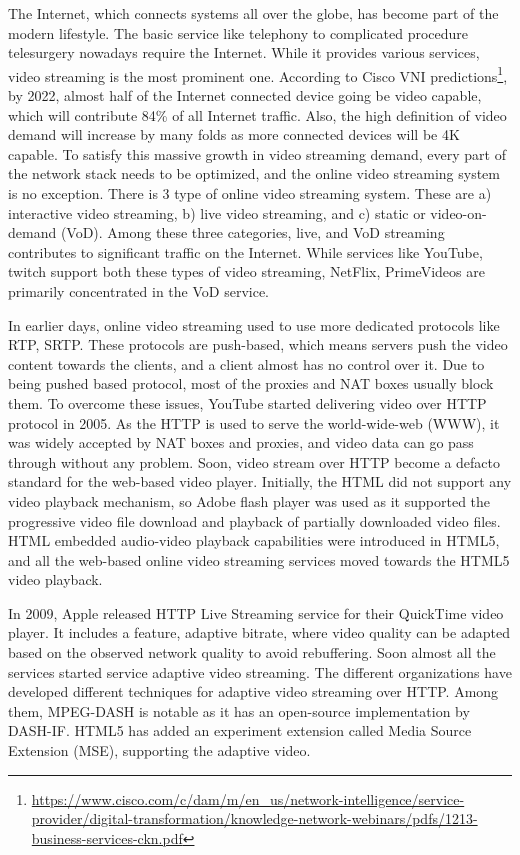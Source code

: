 The Internet, which connects systems all over the globe, has become part of the modern lifestyle. The basic service like telephony to complicated procedure telesurgery nowadays require the Internet. While it provides various services, video streaming is the most prominent one. According to Cisco VNI predictions\footnote{\url{https://www.cisco.com/c/dam/m/en_us/network-intelligence/service-provider/digital-transformation/knowledge-network-webinars/pdfs/1213-business-services-ckn.pdf}}, by 2022, almost half of the Internet connected device going be video capable, which will contribute 84\% of all Internet traffic. Also, the high definition of video demand will increase by many folds as more connected devices will be 4K capable. To satisfy this massive growth in video streaming demand, every part of the network stack needs to be optimized, and the online video streaming system is no exception. There is 3 type of online video streaming system. These are a) interactive video streaming, b) live video streaming, and c) static or video-on-demand (VoD). Among these three categories, live, and VoD streaming contributes to significant traffic on the Internet. While services like YouTube, twitch support both these types of video streaming, NetFlix, PrimeVideos are primarily concentrated in the VoD service. 

In earlier days, online video streaming used to use more dedicated protocols like RTP, SRTP. These protocols are push-based, which means servers push the video content towards the clients, and a client almost has no control over it. Due to being pushed based protocol, most of the proxies and NAT boxes usually block them. To overcome these issues, YouTube started delivering video over HTTP protocol in 2005. As the HTTP is used to serve the world-wide-web (WWW), it was widely accepted by NAT boxes and proxies, and video data can go pass through without any problem. Soon, video stream over HTTP become a defacto standard for the web-based video player. Initially, the HTML did not support any video playback mechanism, so Adobe flash player was used as it supported the progressive video file download and playback of partially downloaded video files. HTML embedded audio-video playback capabilities were introduced in HTML5, and all the web-based online video streaming services moved towards the HTML5 video playback.

In 2009, Apple released HTTP Live Streaming service for their QuickTime video player. It includes a feature, adaptive bitrate, where video quality can be adapted based on the observed network quality to avoid rebuffering. Soon almost all the services started service adaptive video streaming. The different organizations have developed different techniques for adaptive video streaming over HTTP. Among them, MPEG-DASH is notable as it has an open-source implementation by DASH-IF. HTML5 has added an experiment extension called Media Source Extension (MSE), supporting the adaptive video. 

